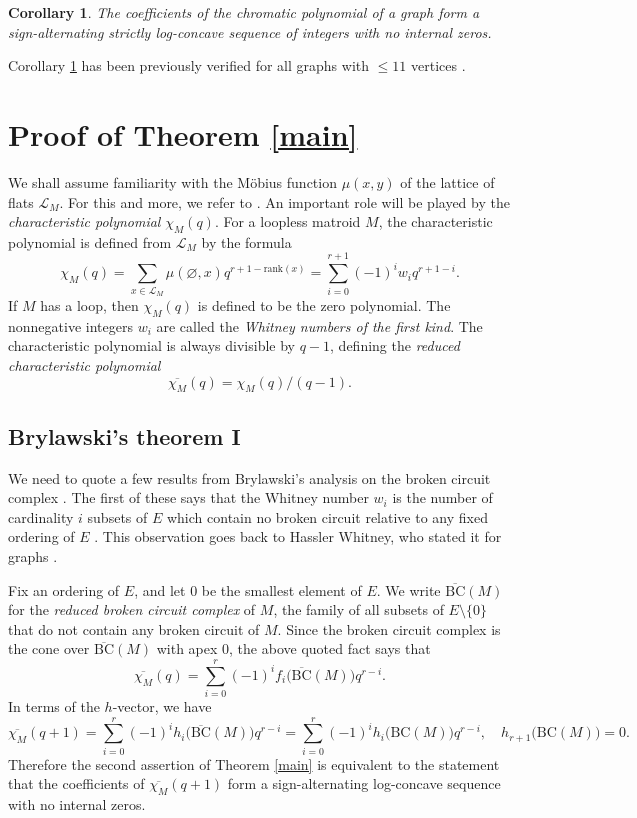 \documentclass{compositio}
\newtheorem{corollary}[theorem]{Corollary}
\theoremstyle{definition}
\theoremstyle{remark}
\begin{document}
\begin{corollary}\label{sub}
The coefficients of the chromatic polynomial of a graph form a sign-alternating strictly log-concave
sequence of integers with no internal zeros.
\end{corollary}

Corollary \ref{sub} has been previously verified for all graphs with $\le 11$ vertices \cite{Lundow-Markstrom}.

 



\section{Proof of Theorem \ref{main}}

We shall assume familiarity with the M\"obius function $\mu(x,y)$ of the lattice of flats $\mathscr{L}_M$. For this and more, we refer to \cite{Aigner,Zaslavsky}. An important role will be played by the \emph{characteristic polynomial} $\chi_M(q)$. For a loopless matroid $M$, the characteristic polynomial is defined from $\mathscr{L}_M$ by the formula
\[
\chi_M(q) = \sum_{x \in \mathscr{L}_M} \mu(\varnothing, x) q^{r+1 - \text{rank} (x)}=\sum_{i=0}^{r+1} (-1)^i w_i q^{r+1-i}.
\]
If $M$ has a loop, then $\chi_M(q)$ is defined to be the zero polynomial. The nonnegative integers $w_i$ are called the \emph{Whitney numbers of the first kind}. The characteristic polynomial is always divisible by $q-1$, defining the \emph{reduced characteristic polynomial}
\[
\overline{\chi_M}(q)=\chi_M(q)/(q-1).
\]

\subsection{Brylawski's theorem I}

We need to quote a few results from Brylawski's analysis on the broken circuit complex \cite{Brylawski}. 
The first of these says that the Whitney number $w_i$ is the number of cardinality $i$ subsets of $E$ which contain no broken circuit relative to any fixed ordering of $E$ \cite[Theorem 3.3]{Brylawski}.
This observation goes back to Hassler Whitney, who stated it for graphs \cite{Whitney}.

Fix an ordering of $E$, and let $0$ be the smallest element of $E$. We write $\overline{\text{BC}}(M)$ for the \emph{reduced broken circuit complex} of $M$, the family of all subsets of $E \setminus \{0\}$ that do not contain any broken circuit of $M$. Since the broken circuit complex is the cone over $\overline{\text{BC}}(M)$ with apex $0$, the above quoted fact says that
\[
\overline{\chi_M}(q)= \sum_{i=0}^r (-1)^if_i\big(\overline{\text{BC}}(M)\big) q^{r-i}.
\]
In terms of the $h$-vector, we have
\[
\overline{\chi_M}(q+1)= \sum_{i=0}^r (-1)^{i} h_i\big(\overline{\text{BC}}(M)\big) q^{r-i}=\sum_{i=0}^r (-1)^{i} h_i\big(\text{BC}(M)\big) q^{r-i}, \quad h_{r+1}\big(\text{BC}(M)\big)=0.
\]
Therefore the second assertion of Theorem \ref{main} is equivalent to the statement that the coefficients of $\overline{\chi_M}(q+1)$ form a sign-alternating log-concave sequence with no internal zeros. 
\end{document}
